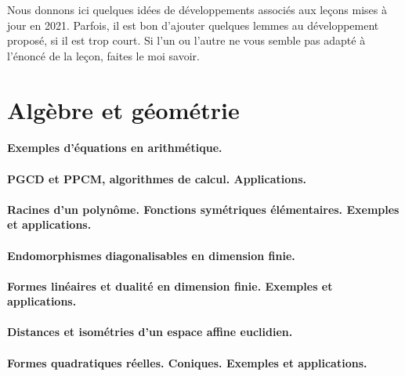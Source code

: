 
Nous donnons ici quelques idées de développements associés aux leçons mises à jour en 2021. Parfois, il est bon d'ajouter quelques lemmes au développement proposé, si il est trop court. Si l'un ou l'autre ne vous semble pas adapté à l'énoncé de la leçon, faites le moi savoir.

\section{Algèbre et géométrie}

\paragraph{Exemples d'équations en arithmétique.}


\paragraph{PGCD et PPCM, algorithmes de calcul. Applications.}
\paragraph{Racines d'un polynôme. Fonctions symétriques élémentaires. Exemples et applications.}
\paragraph{Endomorphismes diagonalisables en dimension finie.}
\paragraph{Formes linéaires et dualité en dimension finie. Exemples et applications.}
\paragraph{Distances et isométries d'un espace affine euclidien.}
\paragraph{Formes quadratiques réelles. Coniques. Exemples et applications.}
